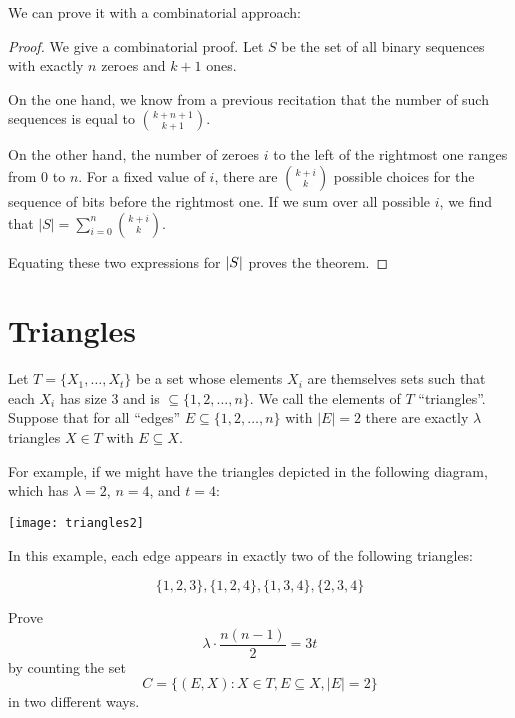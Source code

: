 \documentclass[12pt]{article}
\begin{document}
{We can prove it with a combinatorial approach:

\begin{proof}
We give a combinatorial proof.  Let $S$ be the set of all binary
sequences with exactly $n$ zeroes and $k + 1$ ones.

On the one hand, we know from a previous recitation that the number of
such sequences is equal to $\binom{k + n + 1}{k+1}$.

On the other hand, the number of zeroes $i$ to the left of the rightmost
one ranges from 0 to $n$.  For a fixed value of $i$, there are
$\binom{k + i}{k}$ possible choices for the sequence of bits before the
rightmost one.  If we sum over all possible $i$, we find that
$|S| = \sum_{i = 0}^n \binom{k + i}{k}$.

Equating these two expressions for $\left|S\right|$ proves the theorem.
\end{proof}
} %



\section{Triangles}
Let $T=\{X_1,\ldots, X_t\}$ be a set whose elements $X_i$ are themselves
sets such that each $X_i$ has size 3 and is $\subseteq \{1,2,\ldots, n\}$.
We call the elements of $T$ ``triangles''. Suppose that for all
``edges'' $E\subseteq \{1,2,\ldots, n\}$ with $|E|=2$ there are exactly
$\lambda$ triangles $X\in T$ with $E\subseteq X$.

For example, if we might have the triangles depicted in the following
diagram, which has $\lambda = 2$, $n = 4$, and $t = 4$:

\begin{center}
\texttt{[image: triangles2]}
\end{center}

In this example, each edge appears in exactly two of the following triangles:

$$\{1, 2, 3\}, \{1, 2, 4\}, \{1, 3, 4\}, \{2, 3, 4\}$$

Prove
$$ \lambda \cdot \frac{n(n-1)}{2} = 3t$$
by counting the set
$$C= \{ (E,X) : X\in T, E\subseteq X, |E|=2\}$$
in two different ways.

\end{document}
